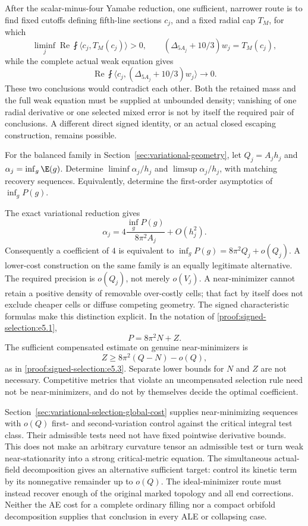 After the scalar-minus-four Yamabe reduction, one sufficient, narrower
route is to find fixed cutoffs defining fifth-line
sections $c_j$, and a fixed radial cap $T_M$, for which
\[
 \liminf_j\operatorname{Re}\fint\langle c_j,T_M(c_j)\rangle>0,
 \qquad (\Delta_{5A_j}+10/3)w_j=T_M(c_j),
\]
while the complete actual weak equation gives
\[
 \operatorname{Re}\fint
 \langle c_j,(\Delta_{5A_j}+10/3)w_j\rangle\longrightarrow0.
\]
These two conclusions would contradict each other. Both the retained
mass and the full weak equation must be supplied at unbounded density;
vanishing of one radial derivative or one selected mixed error is not
by itself the required pair of conclusions. A different direct signed
identity, or an actual closed escaping construction, remains possible.

\begin{problem}
For the balanced family in Section~\ref{sec:variational-geometry}, let
$Q_j=A_jh_j$ and $\alpha_j=\inf_g\E(g)$. Determine
$\liminf\alpha_j/h_j$ and $\limsup\alpha_j/h_j$, with matching recovery
sequences. Equivalently, determine the first-order asymptotics of
$\inf_gP(g)$.
\end{problem}
The exact variational reduction gives
\[
 \alpha_j=4\frac{\inf_gP(g)}{8\pi^2A_j}+O(h_j^2).
\]
Consequently a coefficient of $4$ is equivalent to
$\inf_gP(g)=8\pi^2Q_j+o(Q_j)$. A lower-cost construction on the same
family is an equally legitimate alternative. The required precision is
$o(Q_j)$, not merely $o(V_j)$. A near-minimizer cannot retain a positive
density of removable over-costly cells; that fact by itself does not
exclude cheaper cells or diffuse competing geometry. The signed
characteristic formulas make this distinction explicit. In the notation
of \eqref{proof:signed-selection:e5.1},
\[
 P=8\pi^2N+Z.
\]
The sufficient compensated estimate on genuine near-minimizers is
\begin{equation}\label{eq:open-compensated}
 Z\ge8\pi^2(Q-N)-o(Q),
\end{equation}
as in \eqref{proof:signed-selection:e5.3}. Separate lower bounds for
$N$ and $Z$ are not necessary. Competitive metrics that violate an
uncompensated selection rule need not be near-minimizers, and do not by
themselves decide the optimal coefficient.

Section~\ref{sec:variational-selection-global-cost} supplies
near-minimizing sequences with $o(Q)$ first- and second-variation
control against the critical integral test class. Their admissible
tests need not have fixed pointwise derivative bounds. This does not
make an arbitrary curvature tensor an admissible test or turn weak
near-stationarity into a strong critical-metric equation. The
simultaneous actual-field decomposition gives an alternative sufficient
target: control its kinetic term by its nonnegative remainder up to
$o(Q)$. The ideal-minimizer route must instead recover enough of the
original marked topology and all end corrections. Neither the
AE cost for a complete ordinary filling nor a compact orbifold
decomposition supplies that conclusion in every ALE or collapsing case.

